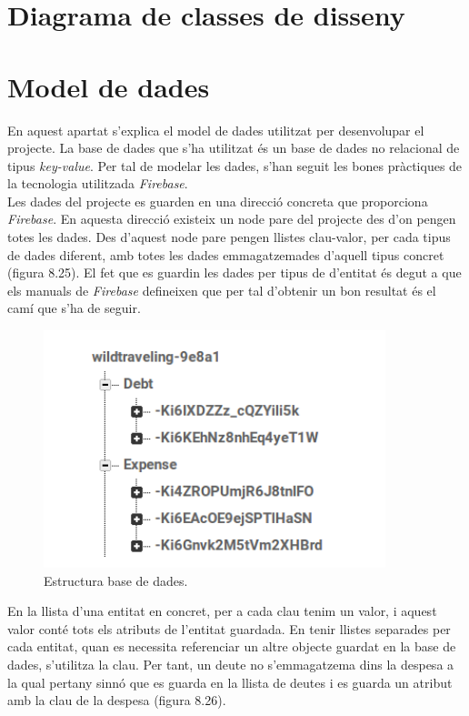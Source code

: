 \section{Diagrama de classes de disseny}

\section{Model de dades}

En aquest apartat s'explica el model de dades utilitzat per desenvolupar el projecte. La base de dades que s'ha utilitzat és un base de dades no relacional de tipus \textit{key-value}. Per tal de modelar les dades, s'han seguit les bones pràctiques de la tecnologia utilitzada \textit{Firebase}.\\

Les dades del projecte es guarden en una direcció concreta que proporciona \textit{Firebase}. En aquesta direcció existeix un node pare del projecte des d'on pengen totes les dades. Des d'aquest node pare pengen llistes clau-valor, per cada tipus de dades diferent, amb totes les dades emmagatzemades d'aquell tipus concret (figura 8.25). El fet que es guardin les dades per tipus de d'entitat és degut a que els manuals de \textit{Firebase} defineixen que per tal d'obtenir un bon resultat és el camí que s'ha de seguir.

\begin{figure}[!h]
\centering
\includegraphics[scale=1.00]{Figures/EstructuraBD.jpg}
\caption{Estructura base de dades.}
\end{figure}


En la llista d'una entitat en concret, per a cada clau tenim un valor, i aquest valor conté tots els atributs de l'entitat guardada. En tenir llistes separades per cada entitat, quan es necessita referenciar un altre objecte guardat en la base de dades, s'utilitza la clau. Per tant, un deute no s'emmagatzema dins la despesa a la qual pertany sinnó que es guarda en la llista de deutes i es guarda un atribut amb la clau de la despesa (figura 8.26).


